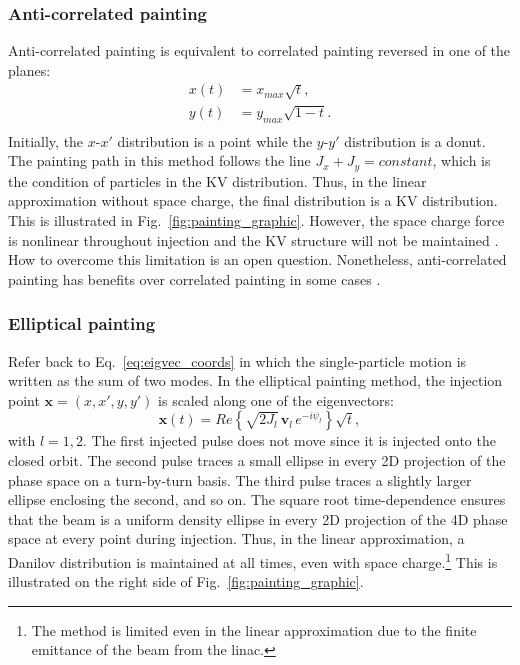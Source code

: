 \subsubsection{Anti-correlated painting}

Anti-correlated painting is equivalent to correlated painting reversed in one of the planes:
%
\begin{equation}
\begin{aligned}
    {x}(t) &= x_{max}\sqrt{t}, \\
    {y}(t) &= y_{max}\sqrt{1 - t}. \\
\end{aligned}
\end{equation}
%
Initially, the $x$-$x'$ distribution is a point while the $y$-$y'$ distribution is a donut. The painting path in this method follows the line $J_x + J_y = constant$, which is the condition of particles in the KV distribution. Thus, in the linear approximation without space charge, the final distribution is a KV distribution. This is illustrated in Fig.~\ref{fig:painting_graphic}. However, the space charge force is nonlinear throughout injection and the KV structure will not be maintained \cite{Crosbie1996}. How to overcome this limitation is an open question. Nonetheless, anti-correlated painting has benefits over correlated painting in some cases \cite{Hotchi2020}.


\subsubsection{Elliptical painting}

Refer back to Eq.~\eqref{eq:eigvec_coords} in which the single-particle motion is written as the sum of two modes. In the elliptical painting method, the injection point $\mathbf{x} = (x, x', y, y')$ is scaled along one of the eigenvectors:
%
\begin{equation}\label{eq:elliptical_painting}
    \mathbf{x}(t) =  
    Re \left\{ \sqrt{2 J_l} \, \mathbf{v}_l \, e^{-i\psi_l} \right\} \sqrt{t},
\end{equation}
%
with $l = 1,2$. The first injected pulse does not move since it is injected onto the closed orbit. The second pulse traces a small ellipse in every 2D projection of the phase space on a turn-by-turn basis. The third pulse traces a slightly larger ellipse enclosing the second, and so on. The square root time-dependence ensures that the beam is a uniform density ellipse in every 2D projection of the 4D phase space at every point during injection. Thus, in the linear approximation, a Danilov distribution is maintained at all times, even with space charge.\footnote{The method is limited even in the linear approximation due to the finite emittance of the beam from the linac.} This is illustrated on the right side of Fig.~\ref{fig:painting_graphic}.

